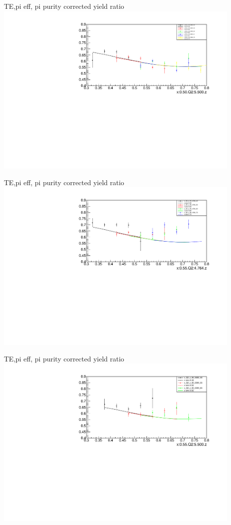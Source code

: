 \begin{frame}{TE,pi eff, pi purity corrected yield ratio}
\includegraphics[width = 0.9\textwidth]{results/yield/statistics_corr/x_Q2_50_5500_ratio.pdf}
\end{frame}
\begin{frame}{TE,pi eff, pi purity corrected yield ratio}
\includegraphics[width = 0.9\textwidth]{results/yield/statistics_corr/x_Q2_55_4764_ratio.pdf}
\end{frame}
\begin{frame}{TE,pi eff, pi purity corrected yield ratio}
\includegraphics[width = 0.9\textwidth]{results/yield/statistics_corr/x_Q2_55_5500_ratio.pdf}
\end{frame}
